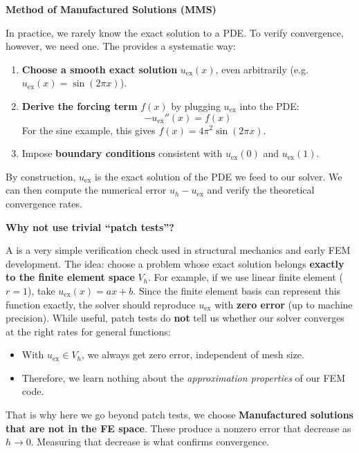 \highspace
\begin{flushleft}
    \textcolor{Green3}{ \textbf{Method of Manufactured Solutions (MMS)}}
\end{flushleft}
In practice, we rarely know the exact solution to a PDE. To verify convergence, however, we need one. The  provides a systematic way:
\begin{enumerate}
    \item \textbf{Choose a smooth exact solution} $u_{\text{ex}}(x)$, even arbitrarily (e.g. $u_{\text{ex}}(x) = \sin(2\pi x)$).
    \item \textbf{Derive the forcing term} $f(x)$ by plugging $u_{\text{ex}}$ into the PDE:
    \begin{equation*}
        -u_{\text{ex}}''(x) = f(x)
    \end{equation*}
    For the sine example, this gives $f(x) = 4\pi^2\sin(2\pi x)$.
    \item Impose \textbf{boundary conditions} consistent with $u_{\text{ex}}(0)$ and $u_{\text{ex}}(1)$.
\end{enumerate}
By construction, $u_{\text{ex}}$ is the exact solution of the PDE we feed to our solver. We can then compute the numerical error $u_h - u_{\text{ex}}$ and verify the theoretical convergence rates.

\highspace
\begin{flushleft}
    \textcolor{Green3}{ \textbf{Why not use trivial ``patch tests''?}}
\end{flushleft}
A  is a very simple verification check used in structural mechanics and early FEM development. The idea: choose a problem whose exact solution belongs \textbf{exactly to the finite element space} $V_{h}$. For example, if we use linear finite element ($r=1$), take $u_{\text{ex}}(x) = a x + b$. Since the finite element basis can represent this function exactly, the solver should reproduce $u_{\text{ex}}$ with \textbf{zero error} (up to machine precision). While useful, patch tests do \textbf{not} tell us whether our solver converges at the right rates for general functions:
\begin{itemize}
    \item With $u_{\text{ex}}\in V_h$, we always get zero error, independent of mesh size.
    \item Therefore, we learn nothing about the \emph{approximation properties} of our FEM code.
\end{itemize}
That is why here we go beyond patch tests, we choose \textbf{Manufactured solutions that are not in the FE space}. These produce a nonzero error that decrease as $h \to 0$. Measuring that decrease is what confirms convergence.

